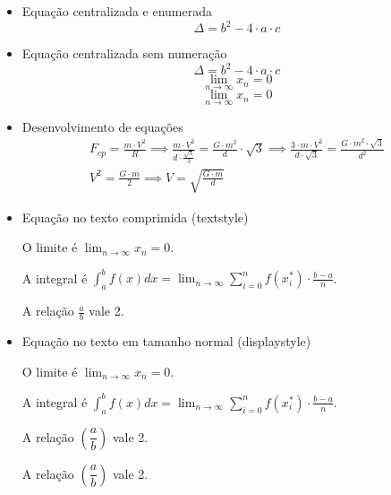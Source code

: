 \begin{itemize}

    \item Equação centralizada e enumerada
        \begin{equation}
            \Delta = b^2-4 \cdot a \cdot c 
        \end{equation}

    \item Equação centralizada sem numeração
        \begin{equation*}
            \Delta = b^2 - 4 \cdot a \cdot c 
        \end{equation*}
        $$ \lim_{n\to\infty}x_n=0 $$
        $$ \textstyle \lim_{n\to\infty}x_n=0 $$
        
    \item Desenvolvimento de equações
        \begin{gather*}
            F_{cp} = \frac{m \cdot V^2}{R} \implies \frac{m \cdot V^2}{d \cdot \frac{\sqrt{3}}{3}} = \frac{G \cdot m^2}{d} \cdot \sqrt{3} \implies \frac{3 \cdot m \cdot V^2}{d \cdot \sqrt{3}} = \frac {G \cdot m^2 \cdot \sqrt{3}}{d^2}\\
            V^2 = \frac{G \cdot m}{2} \implies \boxed{V = \sqrt{\frac{G \cdot m}{d}}}
        \end{gather*}
    
    \item Equação no texto comprimida (textstyle)

        O limite é $\lim_{n\to\infty}x_n=0$.
        
        A integral é $ \int_a^b f(x) dx = \lim_{n \rightarrow
\infty} \sum_{i=0}^n f(x_i^*) \cdot \frac{b-a}{n}$.
        
        A relação $\frac{a}{b}$ vale 2.
    
    \item Equação no texto em tamanho normal (displaystyle)

        O limite é $\displaystyle \lim_{n\to\infty}x_n=0$.
        
        A integral é $ \displaystyle  \int_a^b f(x) dx = \lim_{n \rightarrow
\infty} \sum_{i=0}^n f(x_i^*) \cdot \frac{b-a}{n}$.
        
        A relação $\left (\dfrac{a}{b} \right )$ vale 2.
        
        A relação $ ( \dfrac{a}{b} )$ vale 2.

\end{itemize}

